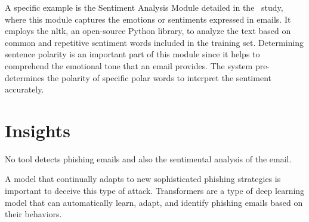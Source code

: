 A specific example is the Sentiment Analysis Module detailed in the~\citet{10085351} study, where this module captures the emotions or sentiments expressed in emails. It employs the \ac{nltk}, an open-source Python library, to analyze the text based on common and repetitive sentiment words included in the training set. Determining sentence polarity is an important part of this module since it helps to comprehend the emotional tone that an email provides. The system pre-determines the polarity of specific polar words to interpret the sentiment accurately. 



\section{Insights}

No tool detects phishing emails and also the sentimental analysis of the email.

A model that continually adapts to new sophisticated phishing strategies is important to deceive this type of attack. Transformers are a type of deep learning model that can automatically learn, adapt, and identify phishing emails based on their behaviors.